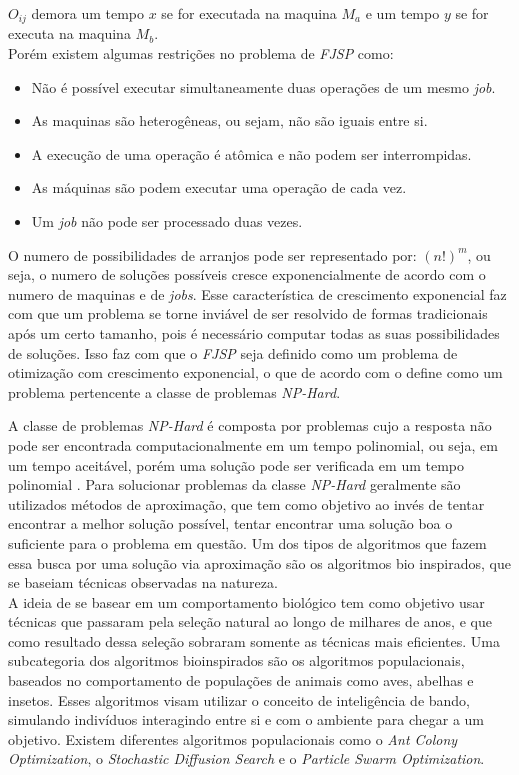 $O_{ij}$ demora um tempo $x$ se for executada na maquina $M_a$ e um tempo $y$ se for executa na maquina $M_b$.\\
Porém existem algumas restrições no problema de \textit{FJSP} como:
\begin{itemize}
    \item Não é possível executar simultaneamente duas operações de um mesmo \textit{job}.
    \item As maquinas são heterogêneas, ou sejam, não são iguais entre si.
    \item A execução de uma operação é atômica e não podem ser interrompidas.
    \item As máquinas são podem executar uma operação de cada vez.
    \item Um \textit{job} não pode ser processado duas vezes.
\end{itemize}

O numero de possibilidades de arranjos pode ser representado por: $(n!)^m$, ou seja, o numero de soluções possíveis cresce exponencialmente de acordo com o numero de maquinas e de \textit{jobs}.
Esse característica de crescimento exponencial faz com que um problema se torne inviável de ser resolvido de formas tradicionais após um certo tamanho, pois é necessário computar todas as suas possibilidades de soluções.
Isso faz com que o \textit{FJSP} seja definido como um problema de otimização com crescimento exponencial, o que de acordo com \citeauthor{Eswaramurthy2008} o define como um problema pertencente a classe de problemas \textit{NP-Hard}.\hfill

\indent A classe de problemas \textit{NP-Hard} é composta por problemas cujo a resposta não pode ser encontrada computacionalmente em um tempo polinomial, ou seja, em um tempo aceitável, porém uma solução pode ser verificada em um tempo polinomial \cite{Eswaramurthy2008}.
Para solucionar problemas da classe \textit{NP-Hard} geralmente são utilizados métodos de aproximação, que tem como objetivo ao invés de tentar encontrar a melhor solução possível, tentar encontrar uma solução boa o suficiente para o problema em questão.
Um dos tipos de algoritmos que fazem essa busca por uma solução via aproximação são os algoritmos bio inspirados, que se baseiam técnicas observadas na natureza.\\
\indent A ideia de se basear em um comportamento biológico tem como objetivo usar técnicas que passaram pela seleção natural ao longo de milhares de anos, e que como resultado dessa seleção sobraram somente as técnicas mais eficientes.
Uma subcategoria dos algoritmos bioinspirados são os algoritmos populacionais, baseados no comportamento de populações de animais como aves, abelhas e insetos.
Esses algoritmos visam utilizar o conceito de inteligência de bando, simulando indivíduos interagindo entre si e com o ambiente para chegar a um objetivo.
Existem diferentes algoritmos populacionais como o \textit{Ant Colony Optimization}, o \textit{Stochastic Diffusion Search} e o \textit{Particle Swarm Optimization}.
